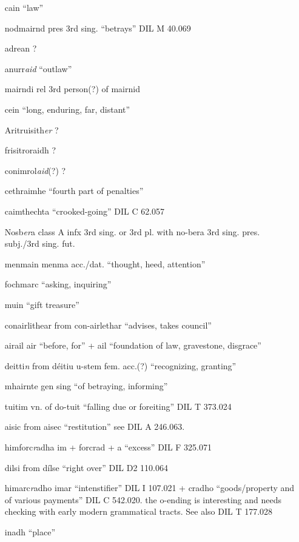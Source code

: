 \documentclass[11pt]{article}
\begin{document}
\begin{enumerate}
  \item[cain] \enquote{law}
  \item[nodmairnd] pres 3rd sing. \enquote{betrays} DIL M 40.069
  \item[adrean] ?
  \item[anurr\emph{aid}] \enquote{outlaw}
  \item[mairndi] rel 3rd person(?) of mairnid
  \item[cein] \enquote{long, enduring, far, distant} 
  \item[Aritruisith\emph{er}] ?
  \item[frisitroraidh] ? 
  \item[conimrol\emph{aid}(?)] ?
  \item[cethraimhe] \enquote{fourth part of penalties}
  \item[caimthechta] \enquote{crooked-going} DIL C 62.057
  \item[Nosb\emph{er}a] class A infx 3rd sing. or 3rd pl. with no-bera 3rd sing. pres. subj./3rd sing. fut.
  \item[menmain] menma acc./dat. \enquote{thought, heed, attention}
  \item[fochmarc] \enquote{asking, inquiring}
  \item[muin] \enquote{gift treasure}
  \item[conairlithear] from con-airlethar \enquote{advises, takes council}
  \item[airail] air \enquote{before, for} + ail \enquote{foundation of law, gravestone, disgrace}
  \item[deitti\emph{n}] from d\'{e}itiu u-stem fem. acc.(?) \enquote{recognizing, granting}
  \item[mhairnte] gen sing \enquote{of betraying, informing}
  \item[tuitim] vn. of do-tuit \enquote{falling due or foreiting} DIL T 373.024
  \item[aisic] from aisec \enquote{restitution} see DIL A 246.063.
  \item[himforc\emph{r}adha] im + forcrad + a \enquote{excess} DIL F 325.071
  \item[dilsi] from d\'{i}lse \enquote{right over} DIL D2 110.064
  \item[himarc\emph{r}adho] imar \enquote{intenstifier} DIL I 107.021 + cradho \enquote{goods/property and of various payments} DIL C 542.020. the o-ending is interesting and needs checking with early modern grammatical tracts.  See also DIL T 177.028
  \item[inadh] \enquote{place}

\end{enumerate}
\end{document}
